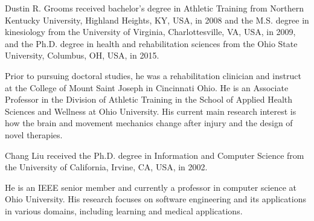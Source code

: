 \documentclass{ieeeaccess}
\begin{document}
\begin{IEEEbiography}{Dustin R. Grooms} received bachelor’s degree in Athletic Training from Northern Kentucky University, Highland Heights, KY, USA, in 2008 and the M.S. degree in kinesiology from the University of Virginia, Charlottesville, VA, USA, in 2009, and the Ph.D. degree in health and rehabilitation sciences from the Ohio State University, Columbus, OH, USA, in 2015. 

Prior to pursuing doctoral studies, he was a rehabilitation clinician and instruct at the College of Mount Saint Joseph in Cincinnati Ohio. He is an Associate Professor in the Division of Athletic Training in the School of Applied Health Sciences and Wellness at Ohio University. His current main research interest is how the brain and movement mechanics change after injury and the design of novel therapies.


\end{IEEEbiography}

\begin{IEEEbiography}{Chang Liu} received the Ph.D. degree in Information and Computer Science from the University of California, Irvine, CA, USA, in 2002. 

He is an IEEE senior member and currently a professor in computer science at Ohio University. His research focuses on software engineering and its applications in various domains, including learning and medical applications. 
\end{IEEEbiography}

\EOD
\end{document}
